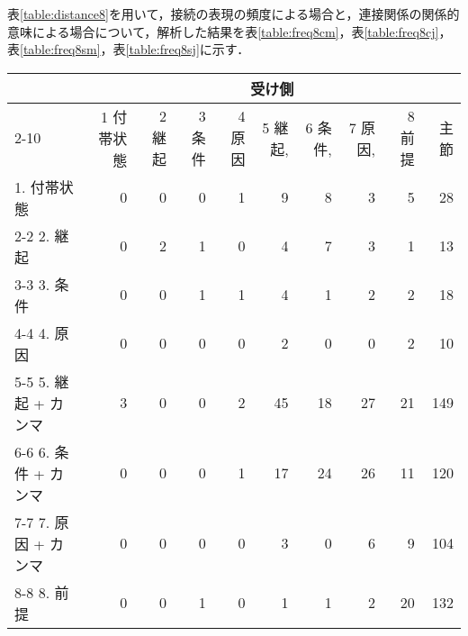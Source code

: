 表\ref{table:distance8}を用いて，接続の表現の頻度による場合と，連接関係の関係的意味による場合について，解析した結果を表\ref{table:freq8cm}，表\ref{table:freq8cj}，表\ref{table:freq8sm}，表\ref{table:freq8sj}に示す．

\begin{table*}
\caption{用例における連接関係で係り側と受け側の頻度（8分類で接続の表現の頻度による）}
\label{table:freq8cm}
\begin{tabular}{|l|r|r|r|r|r|r|r|r|r|}
\hline
\multicolumn{1}{|p{10zw}|}{} & \multicolumn{9}{|c|}{受け側}\\
\cline{2-10}
\multicolumn{1}{|c|}{係り側} & \multicolumn{1}{|p{2zw}|}{1 付帯状態} & \multicolumn{1}{|p{2zw}|}{2 継起} & \multicolumn{1}{|p{2zw}|}{3 条件} & \multicolumn{1}{|p{2zw}|}{4 原因} & \multicolumn{1}{|p{2zw}|}{5 継起,} & \multicolumn{1}{|p{2zw}|}{6 条件,} & \multicolumn{1}{|p{2zw}|}{7 原因,} & \multicolumn{1}{|p{2zw}|}{8 前提} & \multicolumn{1}{|p{2zw}|}{主節}\\
\hline
1. 付帯状態 & 0 & 0 & 0 & 1 & 9 & 8 & 3 & 5 & 28 \\
\cline{2-2}
2. 継起 & 0 & 2 & 1 & 0 & 4 & 7 & 3 & 1 & 13 \\
\cline{3-3}
3. 条件 & 0 & 0 & 1 & 1 & 4 & 1 & 2 & 2 & 18 \\
\cline{4-4}
4. 原因 & 0 & 0 & 0 & 0 & 2 & 0 & 0 & 2 & 10 \\
\cline{5-5}
5. 継起 + カンマ & 3 & 0 & 0 & 2 & 45 & 18 & 27 & 21 & 149 \\
\cline{6-6}
6. 条件 + カンマ & 0 & 0 & 0 & 1 & 17 & 24 & 26 & 11 & 120 \\
\cline{7-7}
7. 原因 + カンマ & 0 & 0 & 0 & 0 & 3 & 0 & 6 & 9 & 104 \\
\cline{8-8}
8. 前提 & 0 & 0 & 1 & 0 & 1 & 1 & 2 & 20 & 132 \\
\hline
\end{tabular}
\end{table*}


